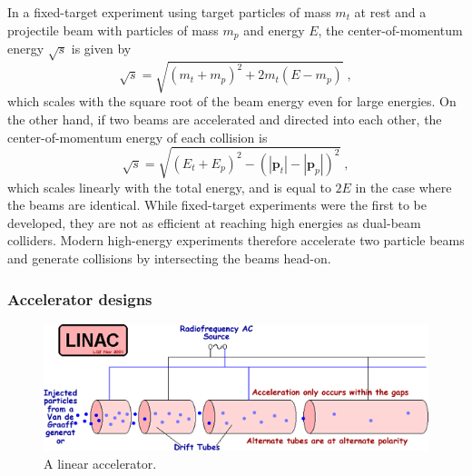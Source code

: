 In a fixed-target experiment using target particles of mass $m_t$ at rest and a projectile beam with particles of mass $m_p$ and energy $E$, the center-of-momentum energy $\sqrt{s}$ is given by
\begin{equation}
\sqrt{s} = \sqrt{(m_t+m_p)^2 + 2 m_t (E - m_p)} \; ,
\end{equation}
which scales with the square root of the beam energy even for large energies.
On the other hand, if two beams are accelerated and directed into each other, the center-of-momentum energy of each collision is
\begin{equation}
\sqrt{s} = \sqrt{(E_t + E_p)^2 - (|\mathbf{p}_t| - |\mathbf{p}_p|)^2} \; ,
\end{equation}
which scales linearly with the total energy, and is equal to $2E$ in the case where the beams are identical.
While fixed-target experiments were the first to be developed, they are not as efficient at reaching high energies as dual-beam colliders.
Modern high-energy experiments therefore accelerate two particle beams and generate collisions by intersecting the beams head-on.

\subsubsection{Accelerator designs}

\begin{figure}[t]
  \includegraphics{LINAC.png}
  \caption{A linear accelerator.}
  \label{fig:linac}
\end{figure}

